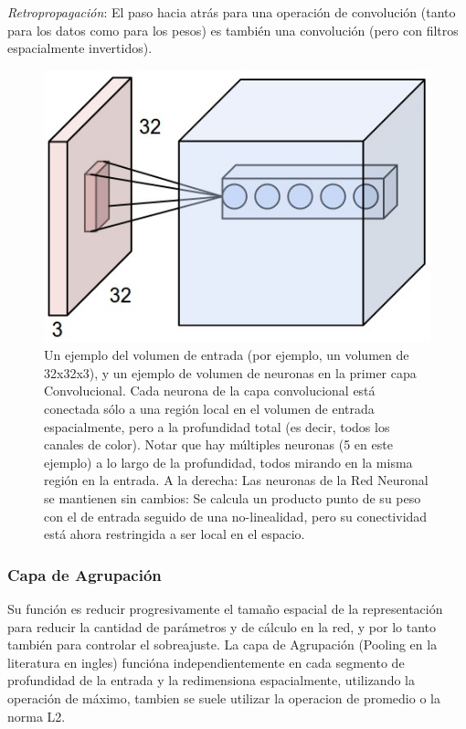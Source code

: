 \documentclass[a4paper,11pt,spanish]{book}
\begin{document}
	\emph{Retropropagación}: El paso hacia atrás para una operación de convolución (tanto para los datos como para los pesos) es también una convolución (pero con filtros espacialmente invertidos).
	\begin{figure}[H]
	  \begin{center}
	   \includegraphics[width=0.8\linewidth]{./img/stanford_conv_layer.jpeg}
	  \end{center}
	  \caption{Un ejemplo del volumen de entrada (por ejemplo, un volumen de 32x32x3), y un ejemplo de volumen de neuronas en la primer capa Convolucional.
	    Cada neurona de la capa convolucional está conectada sólo a una región local en el volumen de entrada espacialmente, pero a la profundidad total (es decir, todos
	    los canales de color). Notar que hay múltiples neuronas (5 en este ejemplo) a lo largo de la profundidad, todos mirando en la misma región en la entrada.
	    A la derecha: Las neuronas de la Red Neuronal se mantienen sin cambios: Se calcula un producto punto de su peso con el de entrada seguido de una no-linealidad,
	    pero su conectividad está ahora restringida a ser local en el espacio. \cite{Stanford}}
	  \label{fig:conv_layer}
	\end{figure}

      \subsubsection{Capa de Agrupación}
	Su función es reducir progresivamente el tamaño espacial de la representación para reducir la cantidad de parámetros y de cálculo en la red, y por lo tanto también para controlar
	el sobreajuste. La capa de Agrupación (Pooling en la literatura en ingles) funcióna independientemente en cada segmento de profundidad de la entrada y la redimensiona espacialmente, utilizando la operación de máximo,
	tambien se suele utilizar la operacion de promedio o la norma L2.\\
\end{document}
